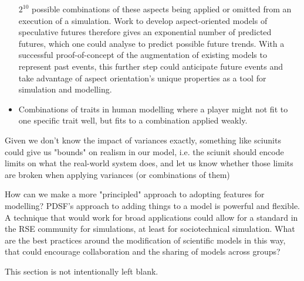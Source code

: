 \begin{itemize}
    \(2^{10}\) possible combinations of these aspects being applied or omitted
    from an execution of a simulation. Work to develop aspect-oriented models of
    speculative futures therefore gives an exponential number of predicted
    futures, which one could analyse to predict possible future trends. With a
    successful proof-of-concept of the augmentation of existing models to
    represent past events, this further step could anticipate future events and
    take advantage of aspect orientation's unique properties as a tool for
    simulation and modelling.
    \item Combinations of traits in human modelling where a player might not fit
    to one specific trait well, but fits to a combination applied weakly.
\end{itemize}



Given we don't know the impact of variances exactly, something like sciunits
could give us "bounds" on realism in our model, i.e. the sciunit should encode
limits on what the real-world system does, and let us know whether those limits
are broken when applying variances (or combinations of them)


How can we make a more "principled" approach to adopting features for modelling?
PDSF's approach to adding things to a model is powerful and flexible. A
technique that would work for broad applications could allow for a standard in
the RSE community for simulations, at least for sociotechnical simulation. What
are the best practices around the modification of scientific models in this way,
that could encourage collaboration and the sharing of models across groups?



This section is not intentionally left blank.

